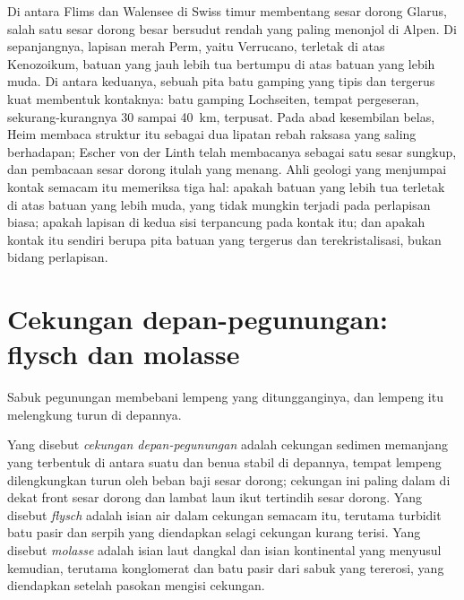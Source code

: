 \begin{inthefield}
Di antara Flims dan Walensee di Swiss timur membentang sesar dorong Glarus, salah satu
sesar dorong besar bersudut rendah yang paling menonjol di Alpen. Di sepanjangnya, lapisan merah Perm, yaitu
Verrucano, terletak di atas  Kenozoikum, batuan yang jauh lebih tua bertumpu di atas batuan yang lebih muda. Di antara keduanya, sebuah
pita batu gamping yang tipis dan tergerus kuat membentuk kontaknya: batu gamping Lochseiten, tempat pergeseran, sekurang-kurangnya 30 sampai
\qty{40}{km}, terpusat. Pada abad kesembilan belas, Heim membaca struktur itu sebagai dua lipatan
rebah raksasa yang saling berhadapan; Escher von der Linth telah membacanya sebagai satu sesar sungkup, dan pembacaan sesar dorong itulah yang menang. Ahli geologi yang menjumpai kontak semacam itu memeriksa
tiga hal: apakah batuan yang lebih tua terletak di atas batuan yang lebih muda, yang tidak mungkin terjadi pada perlapisan biasa;
apakah lapisan di kedua sisi terpancung pada kontak itu; dan apakah kontak itu
sendiri berupa pita batuan yang tergerus dan terekristalisasi, bukan bidang perlapisan.
\end{inthefield}

\section{Cekungan depan-pegunungan: flysch dan molasse}\label{sec:b2:alpine-orogen:foreland}

Sabuk pegunungan membebani lempeng yang ditungganginya, dan lempeng itu melengkung turun di depannya.

\begin{definition}\label{def:b2:alpine-orogen:foreland}
Yang disebut \emph{cekungan depan-pegunungan} adalah cekungan sedimen memanjang yang terbentuk
di antara suatu  dan benua stabil di depannya, tempat lempeng dilengkungkan turun oleh
beban baji sesar dorong; cekungan ini paling dalam di dekat front sesar dorong dan lambat laun ikut
tertindih sesar dorong. Yang disebut \emph{flysch} adalah isian air dalam cekungan
semacam itu, terutama turbidit batu pasir dan serpih yang diendapkan selagi cekungan kurang terisi.
Yang disebut \emph{molasse} adalah isian laut dangkal dan isian kontinental yang menyusul kemudian, terutama
konglomerat dan batu pasir dari sabuk yang tererosi, yang diendapkan setelah pasokan mengisi
cekungan.
\end{definition}

